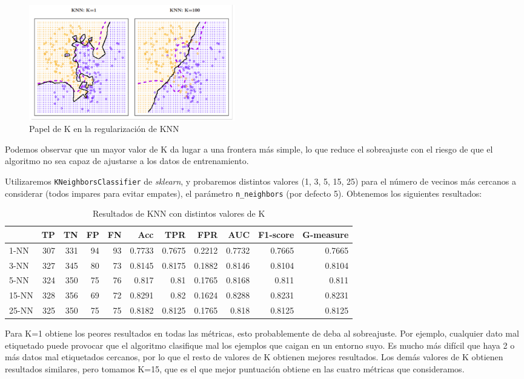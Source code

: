 \documentclass{article}
\begin{document}
\begin{figure}[H]
  \centering
  \includegraphics[width=90mm]{figures/knn100}
  \caption{Papel de K en la regularización de KNN}
  \label{fig:knn}
\end{figure}

Podemos observar que un mayor valor de K da lugar a una frontera más
simple, lo que reduce el sobreajuste con el riesgo de que el algoritmo
no sea capaz de ajustarse a los datos de entrenamiento.

Utilizaremos \texttt{KNeighborsClassifier} de \textit{sklearn}, y
probaremos distintos valores (1, 3, 5, 15, 25) para el número de
vecinos más cercanos a considerar (todos impares para evitar empates),
el parámetro \texttt{n\_neighbors} (por defecto 5). Obtenemos los
siguientes resultados: 

\begin{table}[H]
\centering
\caption{Resultados de KNN con distintos valores de K}
\label{tab:knn-tuning}
\begin{tabular}{|lrrrrrrrrrr|}
\hline
 & TP & TN & FP & FN & Acc & TPR & FPR & AUC & F1-score & G-measure\\ \hline
1-NN & 307 & 331 & 94 & 93 & 0.7733 & 0.7675 & 0.2212 & 0.7732 & 0.7665 & 0.7665\\
3-NN & 327 & 345 & 80 & 73 & 0.8145 & 0.8175 & 0.1882 & 0.8146 & 0.8104 & 0.8104\\
5-NN & 324 & 350 & 75 & 76 & 0.817 & 0.81 & 0.1765 & 0.8168 & 0.811 & 0.811\\
15-NN & 328 & 356 & 69 & 72 & 0.8291 & 0.82 & 0.1624 & 0.8288 & 0.8231 & 0.8231\\
25-NN & 325 & 350 & 75 & 75 & 0.8182 & 0.8125 & 0.1765 & 0.818 & 0.8125 & 0.8125\\
\hline
\end{tabular}
\end{table}

Para K=1 obtiene los peores resultados en todas las métricas, esto
probablemente de deba al sobreajuste. Por ejemplo, cualquier dato mal
etiquetado puede provocar que el algoritmo clasifique mal los ejemplos
que caigan en un entorno suyo. Es mucho más difícil que haya 2 o más
datos mal etiquetados cercanos, por lo que el resto de valores de K
obtienen mejores resultados. Los demás valores de K obtienen
resultados similares, pero tomamos K=15, que es el que mejor
puntuación obtiene en las cuatro métricas que consideramos.
\end{document}
